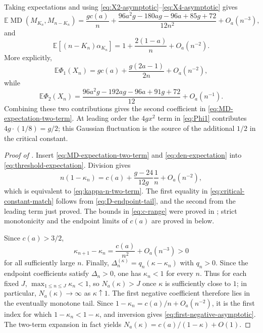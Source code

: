 \documentclass[11pt,a4paper]{amsart}
\numberwithin{equation}{section}
\theoremstyle{plain}
\theoremstyle{definition}
\newcommand{\E}{\mathbb E}
\newcommand{\MD}{\operatorname{MD}}
\begin{document}
Taking expectations and using \eqref{eq:X2-asymptotic}--\eqref{eq:X4-asymptotic}
gives
\begin{equation}\label{eq:MD-expectation-two-term}
 \E\MD(M_{K_n},M_{n-K_n})
 =\frac{gc(a)}n
 +\frac{96a^2g-180ag-96a+85g+72}{12n^2}
 +O_a(n^{-3}),
\end{equation}
and
\begin{equation}\label{eq:den-expectation}
 \E[(n-K_n)\alpha_{K_n}]
 =1+\frac{2(1-a)}n+O_a(n^{-2}).
\end{equation}
More explicitly,
\[
 \E\Phi_1(X_n)
 =gc(a)+\frac{g(2a-1)}{2n}+O_a(n^{-2}),
\]
while
\[
 \E\Phi_2(X_n)
 =\frac{96a^2g-192ag-96a+91g+72}{12}+O_a(n^{-1}).
\]
Combining these two contributions gives the second coefficient in
\eqref{eq:MD-expectation-two-term}.  At leading order the \(4gx^2\) term in
\eqref{eq:Phi1} contributes \(4g\cdot(1/8)=g/2\); this Gaussian fluctuation is
the source of the additional \(1/2\) in the critical constant.

\begin{proof}[Proof of ]
Insert \eqref{eq:MD-expectation-two-term} and \eqref{eq:den-expectation} into
\eqref{eq:threshold-expectation}.  Division gives
\[
 n(1-\kappa_n)
 =c(a)+\frac{g-24}{12g}\frac1n+O_a(n^{-2}),
\]
which is equivalent to \eqref{eq:kappa-n-two-term}.  The first equality in
\eqref{eq:critical-constant-match} follows from \eqref{eq:D-endpoint-tail}, and
the second from the leading term just proved.  The bounds in \eqref{eq:c-range}
were proved in ; strict monotonicity and the
endpoint limits of \(c(a)\) are proved in  below.

Since \(c(a)>3/2\),
\[
 \kappa_{n+1}-\kappa_n
 =\frac{c(a)}{n^2}+O_a(n^{-3})>0
\]
for all sufficiently large \(n\).  Finally,
\(\Delta_n^{(\kappa)}=q_n(\kappa-\kappa_n)\) with \(q_n>0\).  Since the endpoint
coefficients satisfy \(\Delta_n>0\), one has \(\kappa_n<1\) for every \(n\).
Thus for each fixed \(J\), \(\max_{1\le n\le J}\kappa_n<1\), so
\(N_a(\kappa)>J\) once \(\kappa\) is sufficiently close to \(1\); in particular,
\(N_a(\kappa)\to\infty\) as \(\kappa\uparrow1\).  The first negative coefficient
therefore lies in the eventually monotone tail.  Since
\(1-\kappa_n=c(a)/n+O_a(n^{-2})\), it is the first index for which
\(1-\kappa_n<1-\kappa\), and inversion gives
\eqref{eq:first-negative-asymptotic}.
The two-term expansion in fact yields
\(N_a(\kappa)=c(a)/(1-\kappa)+O(1)\).
\end{proof}
\end{document}
